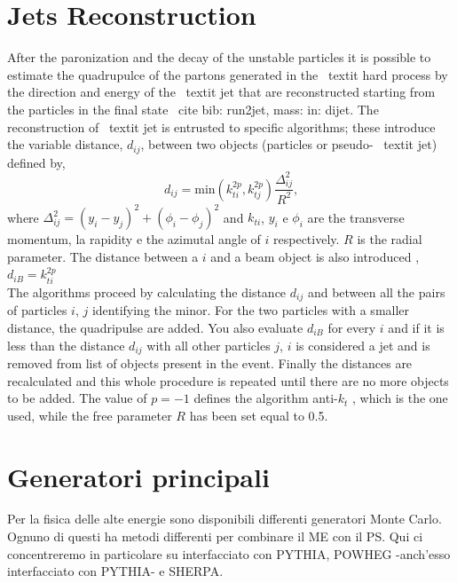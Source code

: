 \section{Jets Reconstruction } 
\label{rico_jet}
After the paronization and the decay of the unstable particles it is possible to estimate the quadrupulce of the partons generated in the \ textit {hard process} by the direction and energy of the \ textit {jet} that are reconstructed starting from the particles in the final state \ cite {bib: run2jet, mass: in: dijet}.
The reconstruction of \ textit {jet} is entrusted to specific algorithms; these introduce the variable distance, $ d_ {ij} $, between two objects (particles or pseudo- \ textit {jet}) defined by,
\begin{equation}
d_{ij}=\mbox{min}( k_{ti}^{2p}, k_{tj}^{2p})  \frac{\Delta_{ij}^2}{R^2} \mbox{,}\end{equation}
where $\Delta_{ij}^2=(y_i - y_j)^2+ (\phi_i - \phi_j)^2$ and $k_{ti}$, $y_i$ e $\phi_i$ are  the transverse momentum, la rapidity  e the azimutal angle of $i$ respectively.  $R$ is the radial parameter. The distance between a $ i $ and a beam object is also introduced , $d_{iB}=k_{ti}^{2p}$ \\

The algorithms proceed by calculating the distance $ d_{ij} $ and between all the pairs of particles $ i $, $ j $ identifying the minor. For the two particles with a smaller distance, the quadripulse are added. You also evaluate $ d_{iB} $ for every $ i $ and if it is less than the distance $ d_{ij} $ with all other particles $ j $, $ i $ is considered a jet and is removed from list of objects present in the event.
Finally the distances are recalculated and this whole procedure is repeated until there are no more objects to be added.
The value of $ p = -1 $ defines the algorithm anti-$k_t $ \cite{Cacciari: 2008gp}, which is the one used, while the free parameter $ R $ has been set equal to 0.5.




\section{Generatori principali}
Per la fisica delle alte energie sono disponibili differenti generatori Monte Carlo.  Ognuno di questi ha metodi differenti per combinare il  ME con il  PS.
Qui ci concentreremo in particolare su  \aMC  interfacciato con  P{\footnotesize YTHIA},   P{\footnotesize OWHEG} -anch'esso interfacciato con   P{\footnotesize YTHIA}- e S{\footnotesize HERPA}. 
 
